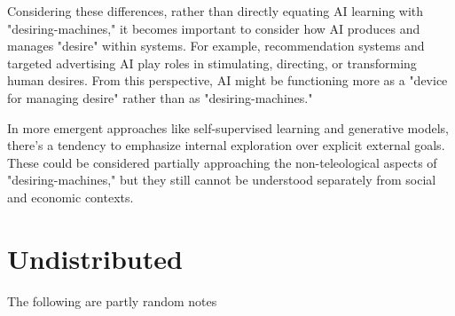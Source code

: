 \begin{orangebox}
	Considering these differences, rather than directly equating AI learning with "desiring-machines," it becomes important to consider how AI produces and manages "desire" within
	systems. For example, recommendation systems and targeted advertising AI play roles in stimulating, directing, or transforming human desires. From this perspective, AI might be functioning more as a "device for managing desire" rather than as "desiring-machines."

	In more emergent approaches like self-supervised learning and generative models, there's a tendency to emphasize internal exploration over explicit external goals. These could be considered partially approaching the non-teleological aspects of "desiring-machines," but they still cannot be understood separately from social and economic contexts. \cite{ai-inquiry2025}
\end{orangebox}





\section{Undistributed}
\begin{orangebox}
	The following are partly random notes
\end{orangebox}



